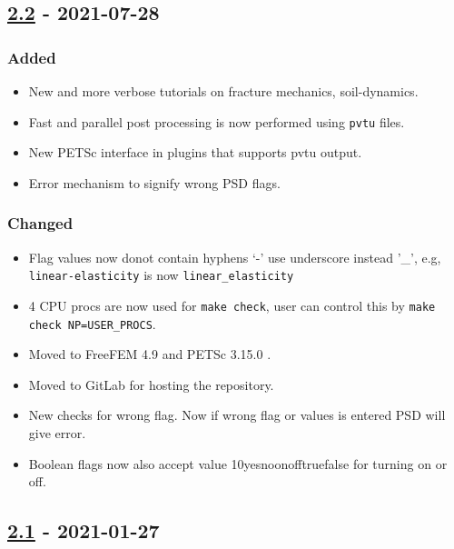 \subsection{\texorpdfstring{\href{https://gitlab.com/PsdSolver/psd_sources/-/tree/v2.2}{2.2}
- 2021-07-28}{2.2 - 2021-07-28}}

\subsubsection{Added}

\begin{itemize}
\tightlist
\item
  New and more verbose tutorials on fracture mechanics, soil-dynamics.
\item
  Fast and parallel post processing is now performed using
  \lstinline!pvtu! files.
\item
  New PETSc interface in plugins that supports pvtu output.
\item
  Error mechanism to signify wrong PSD flags.
\end{itemize}

\subsubsection{Changed}

\begin{itemize}
\tightlist
\item
  Flag values now donot contain hyphens `-' use underscore instead '\_',
  e.g, \lstinline!linear-elasticity! is now
  \lstinline!linear_elasticity!
\item
  4 CPU procs are now used for \lstinline!make check!, user can control
  this by \lstinline!make check NP=USER_PROCS!.
\item
  Moved to FreeFEM 4.9 and PETSc 3.15.0 .
\item
  Moved to GitLab for hosting the repository.
\item
  New checks for wrong flag. Now if wrong flag or values is entered PSD
  will give error.
\item
  Boolean flags now also accept value
  1\textbar{}0\textbar{}yes\textbar{}no\textbar{}on\textbar{}off\textbar{}true\textbar{}false
  for turning on or off.
\end{itemize}

\subsection{\texorpdfstring{\href{https://gitlab.com/PsdSolver/psd_sources/-/tree/v2.1}{2.1}
- 2021-01-27}{2.1 - 2021-01-27}}

